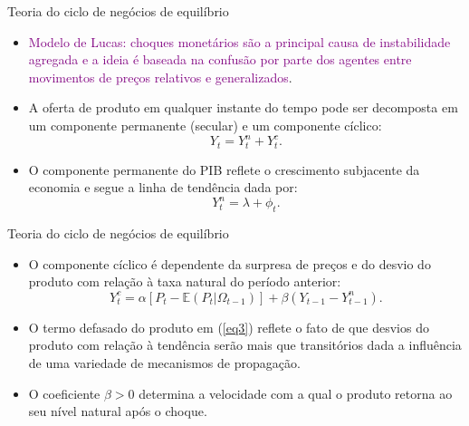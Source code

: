\documentclass[10pt]{beamer}
\begin{document}
\begin{frame}{Teoria do ciclo de negócios de equilíbrio}
    \begin{itemize}
        \item \textcolor{purple}{Modelo de Lucas: choques monetários são a principal causa de instabilidade agregada e a ideia é baseada na confusão por parte dos agentes entre movimentos de preços relativos e generalizados}.
        \bigskip
        \item A oferta de produto em qualquer instante do tempo pode ser decomposta em um componente permanente (secular) e um componente cíclico:
        \begin{equation}
            Y_t = Y_t^n + Y_t^c.
            \label{eq1}
        \end{equation}
        \bigskip
        \item O componente permanente do PIB reflete o crescimento subjacente da economia e segue a linha de tendência dada por:
        \begin{equation}
            Y_t^n = \lambda + \phi_t.
            \label{eq2}
        \end{equation}
    \end{itemize}
\end{frame}

\begin{frame}{Teoria do ciclo de negócios de equilíbrio}
    \begin{itemize}
        \item O componente cíclico é dependente da surpresa de preços e do desvio do produto com relação à taxa natural do período anterior:
        \begin{equation}
            Y_t^c = \alpha[P_t - \mathbb{E}(P_t|\Omega_{t-1})] + \beta(Y_{t-1}-Y_{t-1}^n).
            \label{eq3}
        \end{equation}
        \bigskip
        \item O termo defasado do produto em (\ref{eq3}) reflete o fato de que desvios do produto com relação à tendência serão mais que transitórios dada a influência de uma variedade de mecanismos de propagação.
        \bigskip
        \item O coeficiente $\beta > 0$ determina a velocidade com a qual o produto retorna ao seu nível natural após o choque.
    \end{itemize}
\end{frame}
\end{document}
